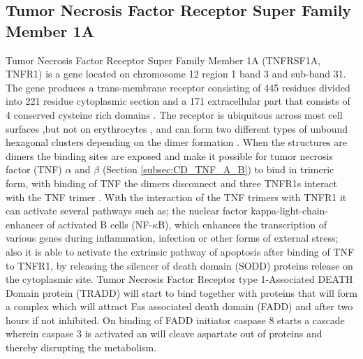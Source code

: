 \subsection{Tumor Necrosis Factor Receptor Super Family Member 1A}
Tumor Necrosis Factor Receptor Super Family Member 1A (TNFRSF1A, TNFR1) is a gene located on chromosome 12 region 1 band 3 and sub-band 31. The gene produces a trans-membrane receptor consisting of 445 residues divided into 221 residue cytoplasmic section and a 171 extracellular part that consists of 4 conserved cysteine rich domains \cite{gray_cloning_1990,walter_encyclopedia_2007,banner_crystal_1993}.
The receptor is ubiquitous across most cell surfaces ,but not on erythrocytes \cite{segueni_innate_2016}, and can form two different types of unbound hexagonal clusters depending on the dimer formation \cite{naismith_crystallographic_1995}. 
When the structures are dimers the binding sites are exposed and make it possible for tumor necrosis factor (TNF) $\alpha$ and $\beta$  (Section \ref{subsec:CD_TNF_A_B}) to bind in trimeric form, with binding of TNF the dimers disconnect and three TNFR1s interact with the TNF trimer \cite{naismith_crystallographic_1995}.
With the interaction of the TNF trimers with TNFR1 it can activate several pathways such as; the nuclear factor kappa-light-chain-enhancer of activated B cells (NF-$\kappa$B), which enhances the transcription of various genes during inflammation, infection or other forms of external stress; also it is able to activate the extrinsic pathway of apoptosis after binding of TNF to TNFR1, by releasing the silencer of death domain (SODD) proteins release on the cytoplasmic site. Tumor Necrosis Factor Receptor type 1-Associated DEATH Domain protein (TRADD) \cite{bender_adaptor_2005}
 will start to bind together with proteins that will form a complex which will attract Fas associated death domain (FADD) and after two hours\cite{muppidi_life_2004} if not inhibited. 
On binding of FADD initiator caspase 8  starts a cascade wherein caspase 3 is activated an will cleave aspartate out of proteins and thereby disrupting the metabolism\cite{vinay_robbins_2014,chen_tnf-r1_2002,hengartner_biochemistry_2000}.
\label{subsec:CD_TNFRSF1A}

